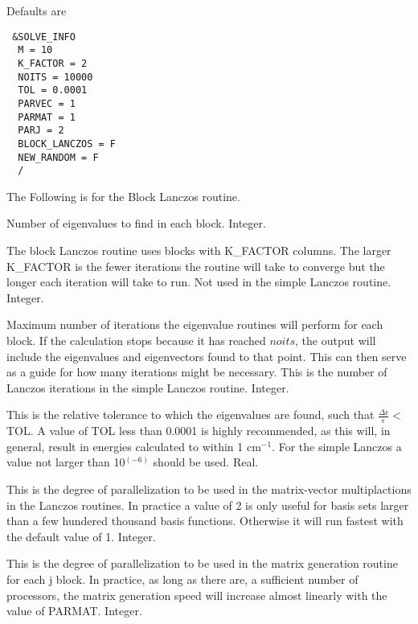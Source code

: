 \documentclass{article}
\newcommand{\wn}{cm$^{-1}$}
\begin{document}
Defaults are

\begin{verbatim}
 &SOLVE_INFO
  M = 10
  K_FACTOR = 2
  NOITS = 10000
  TOL = 0.0001
  PARVEC = 1
  PARMAT = 1
  PARJ = 2
  BLOCK_LANCZOS = F
  NEW_RANDOM = F
  /
\end{verbatim}

\begin{description}
\item The Following is for the Block Lanczos routine.

\item[M] Number of eigenvalues to find in each block. Integer.

\item[K\_FACTOR] The block Lanczos routine uses blocks with 
  K\_FACTOR columns. The larger K\_FACTOR is the fewer iterations
  the routine will take to converge but the longer each iteration
  will take to run. Not used in the simple Lanczos routine. Integer.

\item[NOITS] Maximum number of iterations the eigenvalue routines
  will perform for each block. If the calculation stops because it has
  reached $noits$, the output will include the eigenvalues and
  eigenvectors found to that point. This can then serve as a guide for
  how many iterations might be necessary. This is the number of Lanczos
  iterations in the simple Lanczos routine. Integer.

\item[TOL] This is the relative tolerance to which
  the eigenvalues are found, such that $\frac{\Delta \epsilon
    }{\epsilon } < $TOL. A value of TOL less than 0.0001 is highly
  recommended, as this will, in general, result in energies calculated
  to within 1 \wn . For the simple Lanczos a value not larger than 10$^(-6)$
  should be used. Real.
  
\item[PARVEC] This is the degree of parallelization to be used in
  the matrix-vector multiplactions in the Lanczos routines. In 
  practice a value of 2 is only useful for basis sets larger than
  a few hundered thousand basis functions. Otherwise it will run
  fastest with the default value of 1. Integer.

\item[PARMAT] This is the degree of parallelization to be used in
  the matrix generation routine for each j block. In practice, as long as there are,
  a sufficient number of processors, the matrix generation speed 
  will increase almost linearly with the value of PARMAT. Integer.


\end{description}
\end{document}
